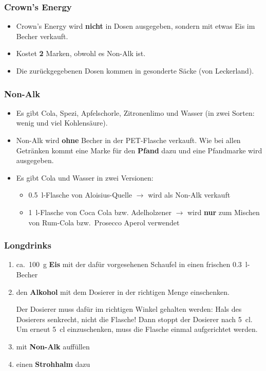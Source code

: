 \subsubsection{Crown's Energy}
\begin{itemize}
  \item Crown's Energy wird \textbf{nicht} in Dosen ausgegeben, sondern mit etwas Eis im Becher verkauft.
  \item Kostet \textbf{2} Marken, obwohl es Non-Alk ist.
  \item Die zurückgegebenen Dosen kommen in gesonderte Säcke (von Leckerland).
\end{itemize}
\subsubsection{Non-Alk}
\begin{itemize}
  \item Es gibt Cola, Spezi, Apfelschorle, Zitronenlimo und Wasser (in zwei Sorten: wenig und viel Kohlensäure).
  \item Non-Alk wird \textbf{ohne} Becher in der PET-Flasche verkauft. Wie bei allen Getränken kommt eine Marke für den \textbf{Pfand} dazu und eine Pfandmarke wird ausgegeben.
  \item Es gibt Cola und Wasser in zwei Versionen:
    \begin{itemize}
      \item \SI{0.5}{\litre}-Flasche von Aloisius-Quelle $\rightarrow$ wird als Non-Alk verkauft
      \item \SI{1}{\litre}-Flasche von Coca Cola bzw. Adelholzener $\rightarrow$ wird \textbf{nur} zum Mischen von Rum-Cola bzw.\ Prosecco Aperol verwendet
    \end{itemize}
\end{itemize}
\subsubsection{Longdrinks}
\begin{enumerate}
  \item ca.\ \SI{100}{\gram} \textbf{Eis} mit der dafür vorgesehenen Schaufel in einen frischen \SI{0.3}{\litre}-Becher
  \item den \textbf{Alkohol} mit dem Dosierer in der richtigen Menge einschenken.
    
    Der Dosierer muss dafür im richtigen Winkel gehalten werden: Hals des Dosierers senkrecht, nicht die Flasche! Dann stoppt der Dosierer nach \SI{5}{\centi\litre}. Um erneut \SI{5}{\centi\litre} einzuschenken, muss die Flasche einmal aufgerichtet werden.
  \item mit \textbf{Non-Alk} auffüllen
  \item einen \textbf{Strohhalm} dazu
\end{enumerate}

